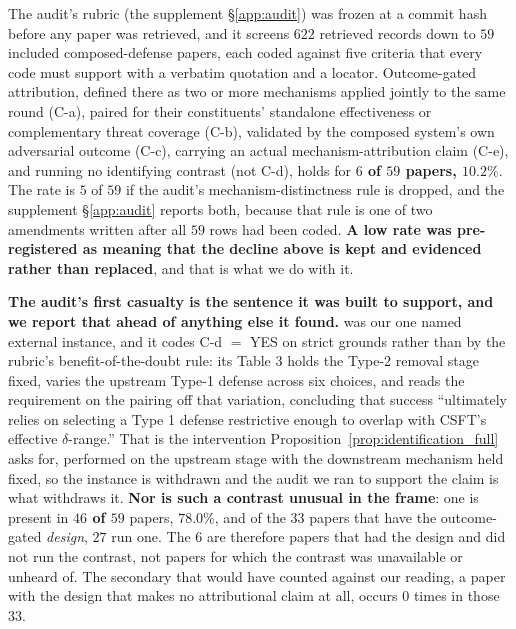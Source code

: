 \documentclass{article}
\begin{document}
\noindent The audit's rubric (the supplement §\ref{app:audit}) was frozen at a commit hash before any paper was retrieved, and it screens $622$ retrieved records down to $59$ included composed-defense papers, each coded against five criteria that every code must support with a verbatim quotation and a locator. Outcome-gated attribution, defined there as two or more mechanisms applied jointly to the same round (C-a), paired for their constituents' standalone effectiveness or complementary threat coverage (C-b), validated by the composed system's own adversarial outcome (C-c), carrying an actual mechanism-attribution claim (C-e), and running no identifying contrast (not C-d), holds for \textbf{$6$ of $59$ papers, $10.2\%$}. The rate is $5$ of $59$ if the audit's mechanism-distinctness rule is dropped, and the supplement §\ref{app:audit} reports both, because that rule is one of two amendments written after all $59$ rows had been coded. \textbf{A low rate was pre-registered as meaning that the decline above is kept and evidenced rather than replaced}, and that is what we do with it.

\noindent \textbf{The audit's first casualty is the sentence it was built to support, and we report that ahead of anything else it found.} \citet{fenaux2025hammer} was our one named external instance, and it codes C-d $=$ YES on strict grounds rather than by the rubric's benefit-of-the-doubt rule: its Table 3 holds the Type-2 removal stage fixed, varies the upstream Type-1 defense across six choices, and reads the requirement on the pairing off that variation, concluding that success ``ultimately relies on selecting a Type 1 defense restrictive enough to overlap with CSFT's effective $\delta$-range.'' That is the intervention Proposition~\ref{prop:identification_full} asks for, performed on the upstream stage with the downstream mechanism held fixed, so the instance is withdrawn and the audit we ran to support the claim is what withdraws it. \textbf{Nor is such a contrast unusual in the frame}: one is present in \textbf{$46$ of $59$} papers, $78.0\%$, and of the \textbf{$33$} papers that have the outcome-gated \emph{design}, \textbf{$27$} run one. The $6$ are therefore papers that had the design and did not run the contrast, not papers for which the contrast was unavailable or unheard of. The secondary that would have counted against our reading, a paper with the design that makes no attributional claim at all, occurs \textbf{$0$} times in those $33$.
\end{document}
